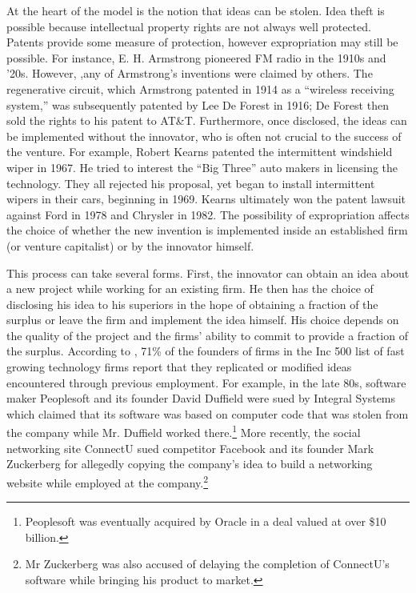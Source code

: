 \documentclass[12pt]{article}
\renewcommand{\cite}{\citet}
\begin{document}
At the heart of the model is the notion that ideas can be stolen. Idea theft is possible because intellectual property rights are not always well protected. Patents provide some measure of protection, however expropriation may still be possible. For instance, E. H. Armstrong  pioneered FM radio in the 1910s and '20s.  However, ,any of Armstrong's inventions were claimed by others. The regenerative circuit, which Armstrong patented in 1914 as a ``wireless receiving system,''  was subsequently patented by Lee De Forest in 1916; De Forest then sold the rights to his patent to AT\&T.  Furthermore, once disclosed, the ideas can be implemented without the innovator, who is often not crucial to the success of the venture. For example,  Robert Kearns patented the  intermittent windshield wiper in 1967.  He tried to interest the ``Big Three'' auto makers in licensing the technology. They all rejected his proposal, yet began to install intermittent wipers in their cars, beginning in 1969.  Kearns ultimately won the patent lawsuit against Ford in 1978 and Chrysler in 1982.  The possibility of expropriation affects the choice of whether the new invention is implemented inside an established firm (or venture capitalist) or by the innovator himself.

This process can take several forms. First, the innovator can obtain an idea about a new project while working for an existing firm. He then has the choice of disclosing his idea to his superiors in the hope of obtaining a fraction of the surplus or leave the firm and implement the idea himself. His choice depends on the quality of the project and the firms' ability to commit to provide a fraction of the surplus. According to \cite{Bhide1999}, 71\% of the founders of firms in the Inc 500 list of fast growing technology firms report that they replicated or modified ideas encountered through previous employment. For example, in the late 80s, software maker Peoplesoft and its founder David Duffield were sued by Integral Systems which claimed that its software was based on computer code that was stolen from the company while Mr. Duffield worked there.\footnote{Peoplesoft was eventually acquired by Oracle in a deal valued at over \$10 billion.} More recently, the social networking site ConnectU sued competitor Facebook and its founder Mark Zuckerberg for allegedly copying the company's idea to build a networking website while employed at the company.\footnote{Mr Zuckerberg was also accused of delaying the completion of ConnectU's software while bringing his product to market.}
\end{document}
